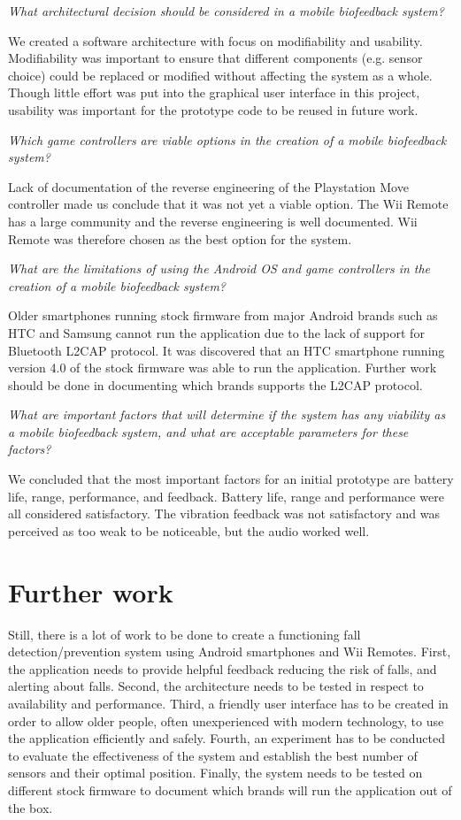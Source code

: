 \textit{What architectural decision should be considered in a mobile biofeedback system?}

We created a software architecture with focus on modifiability and usability. Modifiability was important to ensure that different components (e.g. sensor choice) could be replaced or modified without affecting the system as a whole. Though little effort was put into the graphical user interface in this project, usability was important for the prototype code to be reused in future work. 

\textit{Which game controllers are viable options in the creation of a mobile biofeedback system?}

Lack of documentation of the reverse engineering of the Playstation Move controller made us conclude that it was not yet a viable option. The Wii Remote has a large community and the reverse engineering is well documented. Wii Remote was therefore chosen as the best option for the system.

\textit{What are the limitations of using the Android OS and game controllers in the creation of a mobile biofeedback system?}

Older smartphones running stock firmware from major Android brands such as HTC and Samsung cannot run the application due to the lack of support for Bluetooth L2CAP protocol. It was discovered that an HTC smartphone running version 4.0 of the stock firmware was able to run the application. Further work should be done in documenting which brands supports the L2CAP protocol.


\textit{What are important factors that will determine if the system has any viability as a mobile biofeedback system, and what are acceptable parameters for these factors?}


We concluded that the most important factors for an initial prototype are battery life, range, performance, and feedback. Battery life, range and performance were all considered satisfactory. The vibration feedback was not satisfactory and was perceived as too weak to be noticeable, but the audio worked well.

\section{Further work}
Still, there is a lot of work to be done to create a functioning fall detection/prevention system using Android smartphones and Wii Remotes. First, the application needs to provide helpful feedback reducing the risk of falls, and alerting about falls. Second, the architecture needs to be tested in respect to availability and performance. Third, a friendly user interface has to be created in order to allow older people, often unexperienced with modern technology, to use the application efficiently and safely. Fourth, an experiment has to be conducted to evaluate the effectiveness of the system and establish the best number of sensors and their optimal position. Finally, the system needs to be tested on different stock firmware to document which brands will run the application out of the box.